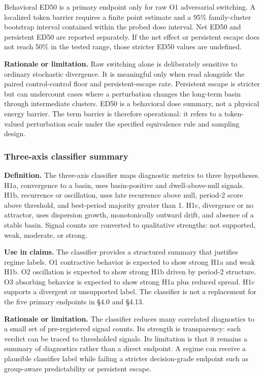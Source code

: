 \documentclass{article}
\theoremstyle{plain}
\theoremstyle{definition}
\begin{document}
Behavioral ED50 is a primary endpoint only for raw O1 adversarial switching. A localized token barrier requires a finite point estimate and a 95\% family-cluster bootstrap interval contained within the probed dose interval. Net ED50 and persistent ED50 are reported separately. If the net effect or persistent escape does not reach 50\% in the tested range, those stricter ED50 values are undefined.

\textbf{Rationale or limitation.} Raw switching alone is deliberately sensitive to ordinary stochastic divergence. It is meaningful only when read alongside the paired control-control floor and persistent-escape rate. Persistent escape is stricter but can undercount cases where a perturbation changes the long-term basin through intermediate clusters. ED50 is a behavioral dose summary, not a physical energy barrier. The term barrier is therefore operational: it refers to a token-valued perturbation scale under the specified equivalence rule and sampling design.

\subsubsection{Three-axis classifier summary}

\textbf{Definition.} The three-axis classifier maps diagnostic metrics to three hypotheses. H1a, convergence to a basin, uses basin-positive and dwell-above-null signals. H1b, recurrence or oscillation, uses late recurrence above null, period-2 score above threshold, and best-period majority greater than 1. H1c, divergence or no attractor, uses dispersion growth, monotonically outward drift, and absence of a stable basin. Signal counts are converted to qualitative strengths: not supported, weak, moderate, or strong.

\textbf{Use in claims.} The classifier provides a structured summary that justifies regime labels. O1 contractive behavior is expected to show strong H1a and weak H1b. O2 oscillation is expected to show strong H1b driven by period-2 structure. O3 absorbing behavior is expected to show strong H1a plus reduced spread. H1c supports a divergent or unsupported label. The classifier is not a replacement for the five primary endpoints in §4.0 and §4.13.

\textbf{Rationale or limitation.} The classifier reduces many correlated diagnostics to a small set of pre-registered signal counts. Its strength is transparency: each verdict can be traced to thresholded signals. Its limitation is that it remains a summary of diagnostics rather than a direct endpoint. A regime can receive a plausible classifier label while failing a stricter decision-grade endpoint such as group-aware predictability or persistent escape.
\end{document}
